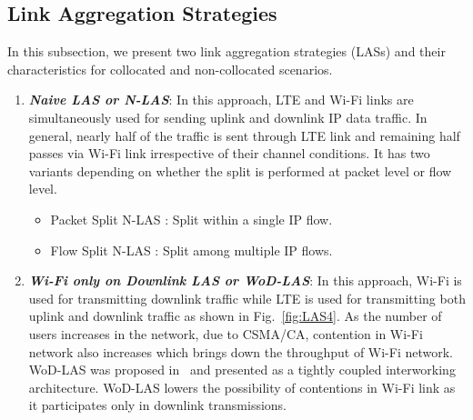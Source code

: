 \documentclass[conference]{IEEEtran}
\begin{document}
\subsection{Link Aggregation Strategies}
\label{subsec:comparison}

In this subsection, we present two link aggregation strategies (LASs) and their characteristics for collocated and non-collocated scenarios. 
\begin{enumerate}
\item \textit{\textbf{Naive LAS or N-LAS}}: In this approach, LTE and Wi-Fi links are simultaneously used for sending uplink and downlink IP data traffic. In general, nearly half of the traffic is sent through LTE link and remaining half passes via Wi-Fi link irrespective of their channel conditions. It has two variants depending on whether the split is performed at packet level or flow level.
\begin{itemize}                                                                                                                                                                                                                                                                                                \item  Packet Split N-LAS : Split within a single IP flow.
\item  Flow Split N-LAS : Split among multiple IP flows.
\end{itemize}
\item \textit{\textbf{Wi-Fi only on Downlink LAS or WoD-LAS}}: In this approach, Wi-Fi is used for transmitting downlink traffic while LTE is used for transmitting both uplink and downlink traffic as shown in Fig.~\ref{fig:LAS4}. As the number of users increases in the network, due to CSMA/CA, contention in Wi-Fi network also increases which brings down the throughput of Wi-Fi network. WoD-LAS was proposed in~\cite{7060499} and presented as a tightly coupled interworking architecture. WoD-LAS lowers the possibility of contentions in Wi-Fi link as it participates only in downlink transmissions.
\end{enumerate}
\end{document}
